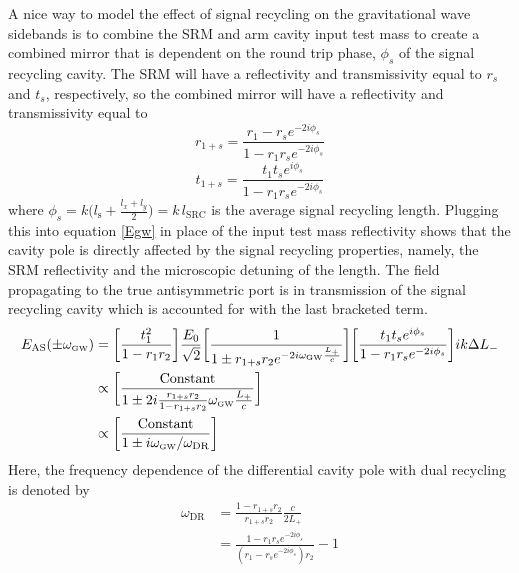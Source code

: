 		A nice way to model the effect of signal recycling on the gravitational wave sidebands is to combine the SRM and  arm cavity input test mass to create a combined  mirror that is dependent on the round trip phase, $\phi_s$ of the signal recycling cavity.  The SRM will have a reflectivity and transmissivity equal to $r_s$ and $t_s$, respectively, so the combined mirror will have a reflectivity and transmissivity equal to
		\begin{equation}
		r_{1+s} = \frac{r_1 - r_s e^{-2i\phi_s}}{1- r_1 r_s e^{-2i\phi_s}}
		\end{equation}
		\begin{equation}
		t_{1+s} = \frac{t_1 t_s e^{i\phi_s}}{1- r_1 r_s e^{-2i\phi_s}}
		\end{equation}
		where $\phi_s = k \big( l_\text{s} + \frac{l_x + l_y}{2} \big) = k \, l_{\text{SRC}}	$ is the average signal recycling length.
		Plugging this into equation \ref{Egw} in place of the input test mass reflectivity shows that the cavity pole is directly affected by the signal recycling properties, namely, the SRM reflectivity and the microscopic detuning of the length. The field propagating to the true antisymmetric port is in transmission of the signal recycling cavity which is accounted for with the last bracketed term. 
		\begin{equation}
		\begin{aligned}
		E_{\text{AS}}(\pm \omega_{\text{\tiny GW}}) & =  \bigg[ \frac{t_1^2}{1-r_1 r_2}\bigg]  \frac{E_0}{\sqrt{2}} \bigg[\frac{ 1}{1 \pm r_{1+s} r_2 e^{-2i  \omega_{\text{\tiny GW}}  \frac{L_+}{c}}} \bigg] \bigg[\frac{t_1 t_s e^{i\phi_s}}{1- r_1 r_s e^{-2i\phi_s}}\bigg] ik\Delta L_-\\
		& \propto \bigg[ \frac{ \text{Constant}}{1 \pm 2 i \frac{r_{1+s} r_2}{1- r_{1+s} r_2}  \omega_{\text{\tiny GW}}  \frac{L_+}{c}}  \bigg]\\
		& \propto \bigg[\frac{\text{Constant}}{1 \pm i \omega_{\text{\tiny GW}}/\omega_{\text{DR}}}\bigg]
		\end{aligned}
		\end{equation}
		Here, the frequency dependence of the differential cavity pole with dual recycling is denoted by
		\begin{equation}
		\begin{aligned}\label{eq:darm_cav_pole}
			\omega_{\text{DR}} 	&=	\frac{1-r_{1+s}r_2}{r_{1+s}r_2}\frac{c}{2L_+}\\
								&=	\frac{1- r_1r_s e^{-2i\phi_s} }{ (r_1 - r_s e^{-2i\phi_s})r_2} - 1
		\end{aligned}
		\end{equation}

